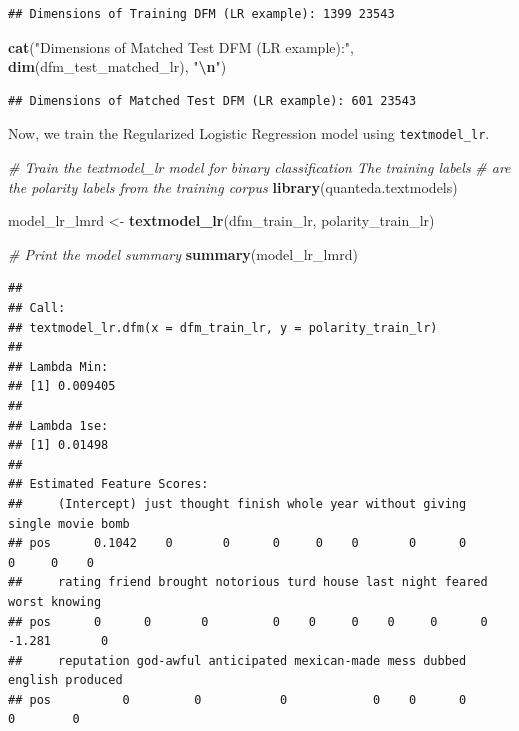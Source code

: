 \documentclass[
]{book}
\newenvironment{Shaded}{\begin{snugshade}}{\end{snugshade}}
\newcommand{\CommentTok}[1]{\textcolor[rgb]{0.56,0.35,0.01}{\textit{#1}}}
\newcommand{\FunctionTok}[1]{\textcolor[rgb]{0.13,0.29,0.53}{\textbf{#1}}}
\newcommand{\NormalTok}[1]{#1}
\newcommand{\OtherTok}[1]{\textcolor[rgb]{0.56,0.35,0.01}{#1}}
\newcommand{\SpecialCharTok}[1]{\textcolor[rgb]{0.81,0.36,0.00}{\textbf{#1}}}
\newcommand{\StringTok}[1]{\textcolor[rgb]{0.31,0.60,0.02}{#1}}
\begin{document}
\begin{verbatim}
## Dimensions of Training DFM (LR example): 1399 23543
\end{verbatim}

\begin{Shaded}
\begin{Highlighting}[]
\FunctionTok{cat}\NormalTok{(}\StringTok{"Dimensions of Matched Test DFM (LR example):"}\NormalTok{, }\FunctionTok{dim}\NormalTok{(dfm\_test\_matched\_lr), }\StringTok{"}\SpecialCharTok{\textbackslash{}n}\StringTok{"}\NormalTok{)}
\end{Highlighting}
\end{Shaded}

\begin{verbatim}
## Dimensions of Matched Test DFM (LR example): 601 23543
\end{verbatim}

Now, we train the Regularized Logistic Regression model using \texttt{textmodel\_lr}.

\begin{Shaded}
\begin{Highlighting}[]
\CommentTok{\# Train the textmodel\_lr model for binary classification The training labels}
\CommentTok{\# are the polarity labels from the training corpus}
\FunctionTok{library}\NormalTok{(quanteda.textmodels)}

\NormalTok{model\_lr\_lmrd }\OtherTok{\textless{}{-}} \FunctionTok{textmodel\_lr}\NormalTok{(dfm\_train\_lr, polarity\_train\_lr)}

\CommentTok{\# Print the model summary}
\FunctionTok{summary}\NormalTok{(model\_lr\_lmrd)}
\end{Highlighting}
\end{Shaded}

\begin{verbatim}
## 
## Call:
## textmodel_lr.dfm(x = dfm_train_lr, y = polarity_train_lr)
## 
## Lambda Min:
## [1] 0.009405
## 
## Lambda 1se:
## [1] 0.01498
## 
## Estimated Feature Scores:
##     (Intercept) just thought finish whole year without giving single movie bomb
## pos      0.1042    0       0      0     0    0       0      0      0     0    0
##     rating friend brought notorious turd house last night feared  worst knowing
## pos      0      0       0         0    0     0    0     0      0 -1.281       0
##     reputation god-awful anticipated mexican-made mess dubbed english produced
## pos          0         0           0            0    0      0       0        0
\end{verbatim}
\end{document}
